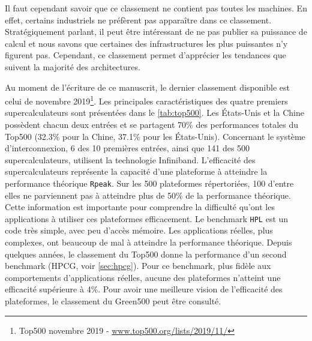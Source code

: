         Il faut cependant savoir que ce classement ne contient pas toutes les machines. En effet, certains industriels ne préfèrent pas apparaître dans ce classement. Stratégiquement parlant, il peut être intéressant de ne pas publier sa puissance de calcul et nous savons que certaines des infrastructures les plus puissantes n'y figurent pas. Cependant, ce classement permet d'apprécier les tendances que suivent la majorité des architectures.
        
        Au moment de l'écriture de ce manuscrit, le dernier classement disponible est celui de novembre 2019\footnote{Top500 novembre 2019 -  \url{www.top500.org/lists/2019/11/}}. Les principales caractéristiques des quatre premiers supercalculateurs sont présentées dans le \autoref{tab:top500}. Les États-Unis et la Chine possèdent chacun deux entrées et se partagent 70\% des performances totales du Top500 (32.3\% pour la Chine, 37.1\% pour les États-Unis). Concernant le système d'interconnexion, 6 des 10 premières entrées, ainsi que 141 des 500 supercalculateurs,  utilisent la technologie Infiniband.
        L'efficacité des supercalculateurs représente la capacité d'une plateforme à atteindre la performance théorique \verb|Rpeak|. Sur les 500 plateformes répertoriées, 100 d'entre elles ne parviennent pas à atteindre plus de 50\% de la performance théorique. Cette information est importante pour comprendre la difficulté qu'ont les applications à utiliser ces plateformes efficacement. Le benchmark \verb|HPL| est un code très simple, avec peu d'accès mémoire. Les applications réelles, plus complexes, ont beaucoup de mal à atteindre la performance théorique. Depuis quelques années, le classement du Top500 donne la performance d'un second benchmark (HPCG, voir \autoref{sec:hpcg}). Pour ce benchmark, plus fidèle aux comportements d'applications réelles, aucune des plateformes n'atteint une efficacité supérieure à 4\%. Pour avoir une meilleure vision de l'efficacité des plateformes, le classement du Green500 peut être consulté.


